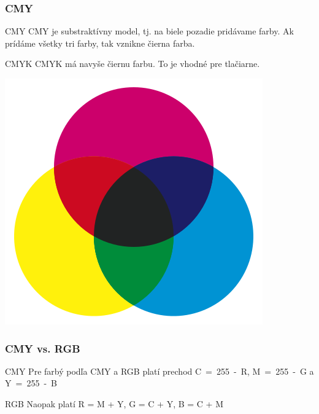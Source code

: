 \documentclass{beamer}
\begin{document}
\begin{frame}
\frametitle{CMY}
  \begin{block}{CMY}
  CMY je substraktívny model, tj. na biele pozadie pridávame farby. Ak prídáme všetky tri farby, tak vznikne čierna farba. 
  \end{block} 

  \begin{block}{CMYK}
  CMYK má navyše čiernu farbu. To je vhodné pre tlačiarne. 
  \end{block} 

  \begin{center}
  \includegraphics[height=0.5\textheight]{CMY.png}
  \end{center}
\end{frame}

\begin{frame}
\frametitle{CMY vs. RGB}
  \begin{block}{CMY}
  Pre farbý podľa CMY a RGB platí prechod C~=~255~-~R, M~=~255~-~G a Y~=~255~-~B
  \end{block} 
  
  \pause

  \begin{block}{RGB}
  Naopak platí R = M + Y, G = C + Y, B = C + M
  \end{block} 
\end{frame}
\end{document}
